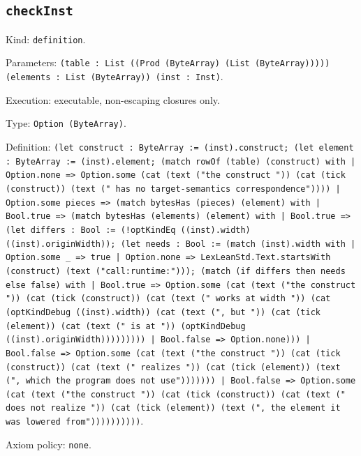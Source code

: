 \documentclass[11pt]{article}
\begin{document}
\subsection*{\texttt{checkInst}}
\noindent Kind: \texttt{definition}.\par
\noindent Parameters: \texttt{(table : List ((Prod (ByteArray) (List (ByteArray))))) (elements : List (ByteArray)) (inst : Inst)}.\par
\noindent Execution: executable, non-escaping closures only.\par
\noindent Type: \texttt{Option (ByteArray)}.\par
\noindent Definition: \texttt{(let construct : ByteArray := (inst).construct; (let element : ByteArray := (inst).element; (match rowOf (table) (construct) with | Option.none => Option.some (cat (text ("the construct ")) (cat (tick (construct)) (text (" has no target-semantics correspondence")))) | Option.some pieces => (match bytesHas (pieces) (element) with | Bool.true => (match bytesHas (elements) (element) with | Bool.true => (let differs : Bool := (!optKindEq ((inst).width) ((inst).originWidth)); (let needs : Bool := (match (inst).width with | Option.some \_ => true | Option.none => LexLeanStd.Text.startsWith (construct) (text ("call:runtime:"))); (match (if differs then needs else false) with | Bool.true => Option.some (cat (text ("the construct ")) (cat (tick (construct)) (cat (text (" works at width ")) (cat (optKindDebug ((inst).width)) (cat (text (", but ")) (cat (tick (element)) (cat (text (" is at ")) (optKindDebug ((inst).originWidth))))))))) | Bool.false => Option.none))) | Bool.false => Option.some (cat (text ("the construct ")) (cat (tick (construct)) (cat (text (" realizes ")) (cat (tick (element)) (text (", which the program does not use"))))))) | Bool.false => Option.some (cat (text ("the construct ")) (cat (tick (construct)) (cat (text (" does not realize ")) (cat (tick (element)) (text (", the element it was lowered from"))))))))))}.\par
\noindent Axiom policy: \texttt{none}.\par
\end{document}
